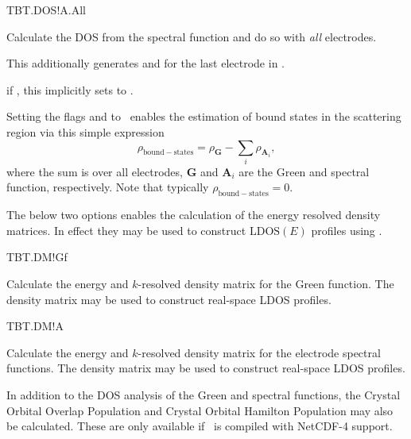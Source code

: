 \begin{fdflogicalF}{TBT.DOS!A.All}

  Calculate the DOS from the spectral function and do so with
  \emph{all} electrodes.

  This additionally generates  and
   for the last electrode in .

  \note if \fdftrue, this implicitly sets  to \fdftrue.

\end{fdflogicalF}

Setting the flags  and  to
\fdftrue\ enables the estimation of bound states in the scattering
region via this simple expression
\begin{equation}
  \rho_{\mathrm{bound-states}} = \rho_{\mathbf G} - 
  \sum_i \rho_{\mathbf A_i},
\end{equation}
where the sum is over all electrodes, $\mathbf G$ and $\mathbf A_i$ are
the Green and spectral function, respectively. Note that typically
$\rho_{\mathrm{bound-states}}=0$.

The below two options enables the calculation of the energy resolved
density matrices. In effect they may be used to construct
$\mathrm{LDOS}(E)$ profiles using \sisl.

\begin{fdflogicalF}{TBT.DM!Gf}

  Calculate the energy and $k$-resolved density matrix for the Green
  function. The density matrix may be used to construct 
  real-space LDOS profiles.
  
\end{fdflogicalF}

\begin{fdflogicalF}{TBT.DM!A}

  Calculate the energy and $k$-resolved density matrix for the
  electrode spectral functions. The density matrix may be used to
  construct real-space LDOS profiles.
  
\end{fdflogicalF}


In addition to the DOS analysis of the Green and spectral functions,
the Crystal Orbital Overlap Population and Crystal Orbital Hamilton
Population may also be calculated. These are only available if
\tbtrans\ is compiled with NetCDF-4 support.


